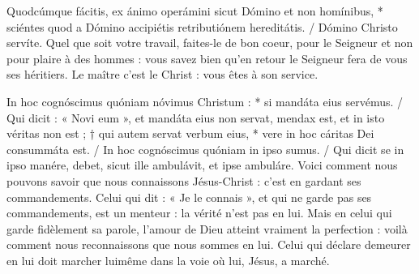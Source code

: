 \documentclass[Session2024.tex]{subfiles}
\begin{document}
{Quodcúmque fácitis, ex ánimo operámini sicut Dómino et non
homínibus, * sciéntes quod a Dómino accipiétis retributiónem hereditátis. / Dómino Christo servíte.}
{Quel que soit votre travail, faites-le de bon coeur, pour le Seigneur et non
pour plaire à des hommes : vous savez bien qu’en retour le Seigneur fera
de vous ses héritiers. Le maître c’est le Christ : vous êtes à son service.}






\translation{}





{In hoc cognóscimus quóniam nóvimus Christum : * si mandáta eius
servémus. / Qui dicit : « Novi eum », et mandáta eius non servat, mendax
est, et in isto véritas non est ; † qui autem servat verbum eius, * vere in
hoc cáritas Dei consummáta est. / In hoc cognóscimus quóniam in ipso
sumus. / Qui dicit se in ipso manére, debet, sicut ille ambulávit, et ipse
ambuláre.}
{Voici comment nous pouvons savoir que nous connaissons Jésus-Christ :
c’est en gardant ses commandements. Celui qui dit : « Je le connais »,
et qui ne garde pas ses commandements, est un menteur : la vérité n’est
pas en lui. Mais en celui qui garde fidèlement sa parole, l’amour de Dieu
atteint vraiment la perfection : voilà comment nous reconnaissons que
nous sommes en lui. Celui qui déclare demeurer en lui doit marcher luimême
dans la voie où lui, Jésus, a marché.}
\end{document}
